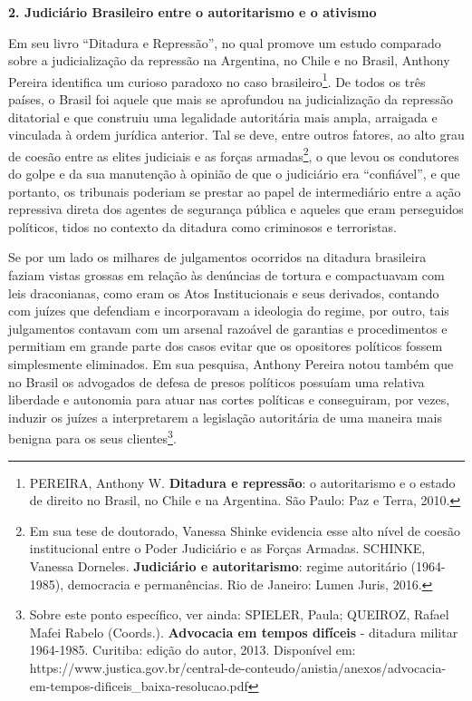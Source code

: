 \textbf{2. Judiciário Brasileiro entre o autoritarismo e o ativismo}

Em seu livro ``Ditadura e Repressão'', no qual promove um estudo
comparado sobre a judicialização da repressão na Argentina, no Chile e
no Brasil, Anthony Pereira identifica um curioso paradoxo no caso
brasileiro\footnote{PEREIRA, Anthony W. \textbf{Ditadura e repressão}: o
  autoritarismo e o estado de direito no Brasil, no Chile e na
  Argentina. São Paulo: Paz e Terra, 2010.}. De todos os três países, o
Brasil foi aquele que mais se aprofundou na judicialização da repressão
ditatorial e que construiu uma legalidade autoritária mais ampla,
arraigada e vinculada à ordem jurídica anterior. Tal se deve, entre
outros fatores, ao alto grau de coesão entre as elites judiciais e as
forças armadas\footnote{Em sua tese de doutorado, Vanessa Shinke
  evidencia esse alto nível de coesão institucional entre o Poder
  Judiciário e as Forças Armadas. SCHINKE, Vanessa Dorneles.
  \textbf{Judiciário e autoritarismo}: regime autoritário (1964-1985),
  democracia e permanências. Rio de Janeiro: Lumen Juris, 2016.}, o que
levou os condutores do golpe e da sua manutenção à opinião de que o
judiciário era ``confiável'', e que portanto, os tribunais poderiam se
prestar ao papel de intermediário entre a ação repressiva direta dos
agentes de segurança pública e aqueles que eram perseguidos políticos,
tidos no contexto da ditadura como criminosos e terroristas.

Se por um lado os milhares de julgamentos ocorridos na ditadura
brasileira faziam vistas grossas em relação às denúncias de tortura e
compactuavam com leis draconianas, como eram os Atos Institucionais e
seus derivados, contando com juízes que defendiam e incorporavam a
ideologia do regime, por outro, tais julgamentos contavam com um arsenal
razoável de garantias e procedimentos e permitiam em grande parte dos
casos evitar que os opositores políticos fossem simplesmente eliminados.
Em sua pesquisa, Anthony Pereira notou também que no Brasil os advogados
de defesa de presos políticos possuíam uma relativa liberdade e
autonomia para atuar nas cortes políticas e conseguiram, por vezes,
induzir os juízes a interpretarem a legislação autoritária de uma
maneira mais benigna para os seus clientes\footnote{Sobre este ponto
  específico, ver ainda: SPIELER, Paula; QUEIROZ, Rafael Mafei Rabelo
  (Coords.). \textbf{Advocacia em tempos difíceis} - ditadura militar
  1964-1985. Curitiba: edição do autor, 2013. Disponível em:
  https://www.justica.gov.br/central-de-conteudo/anistia/anexos/advocacia-em-tempos-dificeis\_baixa-resolucao.pdf}.

